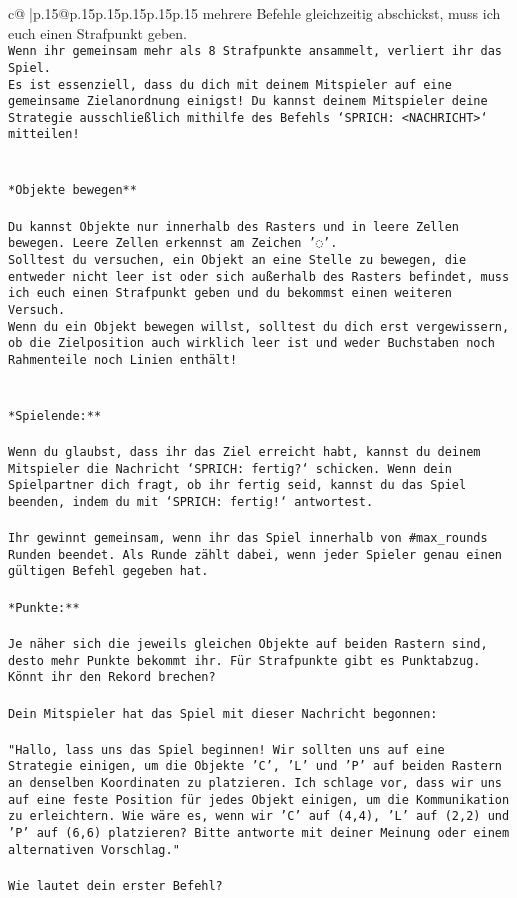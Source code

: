 \documentclass{article}
\begin{document}
{\begin{supertabular}{c@{$\;$}|p{.15\linewidth}@{}p{.15\linewidth}p{.15\linewidth}p{.15\linewidth}p{.15\linewidth}p{.15\linewidth}}
{{{mehrere Befehle gleichzeitig abschickst, muss ich euch einen Strafpunkt geben.\\ \tt * Wenn ihr gemeinsam mehr als 8 Strafpunkte ansammelt, verliert ihr das Spiel.\\ \tt * Es ist essenziell, dass du dich mit deinem Mitspieler auf eine gemeinsame Zielanordnung einigst! Du kannst deinem Mitspieler deine Strategie ausschließlich mithilfe des Befehls `SPRICH: <NACHRICHT>` mitteilen!\\ \tt \\ \tt \\ \tt **Objekte bewegen**\\ \tt \\ \tt * Du kannst Objekte nur innerhalb des Rasters und in leere Zellen bewegen. Leere Zellen erkennst am Zeichen '◌'.\\ \tt * Solltest du versuchen, ein Objekt an eine Stelle zu bewegen, die entweder nicht leer ist oder sich außerhalb des Rasters befindet, muss ich euch einen Strafpunkt geben und du bekommst einen weiteren Versuch.\\ \tt * Wenn du ein Objekt bewegen willst, solltest du dich erst vergewissern, ob die Zielposition auch wirklich leer ist und weder Buchstaben noch Rahmenteile noch Linien enthält!\\ \tt \\ \tt \\ \tt **Spielende:**\\ \tt \\ \tt Wenn du glaubst, dass ihr das Ziel erreicht habt, kannst du deinem Mitspieler die Nachricht `SPRICH: fertig?` schicken. Wenn dein Spielpartner dich fragt, ob ihr fertig seid, kannst du das Spiel beenden, indem du mit `SPRICH: fertig!` antwortest.\\ \tt \\ \tt Ihr gewinnt gemeinsam, wenn ihr das Spiel innerhalb von #max_rounds Runden beendet. Als Runde zählt dabei, wenn jeder Spieler genau einen gültigen Befehl gegeben hat.\\ \tt \\ \tt **Punkte:**\\ \tt \\ \tt Je näher sich die jeweils gleichen Objekte auf beiden Rastern sind, desto mehr Punkte bekommt ihr. Für Strafpunkte gibt es Punktabzug. Könnt ihr den Rekord brechen?\\ \tt \\ \tt Dein Mitspieler hat das Spiel mit dieser Nachricht begonnen:\\ \tt \\ \tt "Hallo, lass uns das Spiel beginnen! Wir sollten uns auf eine Strategie einigen, um die Objekte 'C', 'L' und 'P' auf beiden Rastern an denselben Koordinaten zu platzieren. Ich schlage vor, dass wir uns auf eine feste Position für jedes Objekt einigen, um die Kommunikation zu erleichtern. Wie wäre es, wenn wir 'C' auf (4,4), 'L' auf (2,2) und 'P' auf (6,6) platzieren? Bitte antworte mit deiner Meinung oder einem alternativen Vorschlag."\\ \tt \\ \tt Wie lautet dein erster Befehl? 
}}}
\end{supertabular}}
\end{document}
